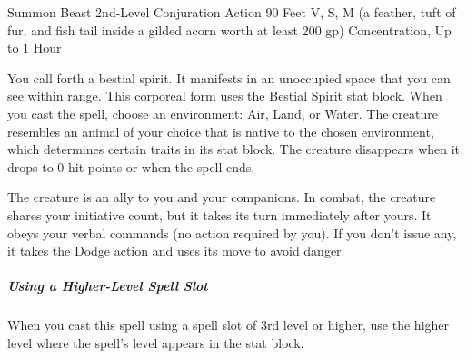 \documentclass[letterpaper,openany,oneside,twocolumn]{book}
\begin{document}
\DndSpellHeader
  {Summon Beast}
  {2nd-Level Conjuration}
  {Action}
  {90 Feet}
  {V, S, M (a feather, tuft of fur, and fish tail inside a gilded acorn worth at least 200 gp)}
  {Concentration, Up to 1 Hour}

You call forth a bestial spirit. It manifests in an unoccupied space that you can see within range. This corporeal form uses the Bestial Spirit stat block. When you cast the spell, choose an environment: Air, Land, or Water. The creature resembles an animal of your choice that is native to the chosen environment, which determines certain traits in its stat block. The creature disappears when it drops to 0 hit points or when the spell ends.

The creature is an ally to you and your companions. In combat, the creature shares your initiative count, but it takes its turn immediately after yours. It obeys your verbal commands (no action required by you). If you don't issue any, it takes the Dodge action and uses its move to avoid danger.

\subparagraph*{Using a Higher-Level Spell Slot} When you cast this spell using a spell slot of 3rd level or higher, use the higher level where the spell's level appears in the stat block.
\end{document}
